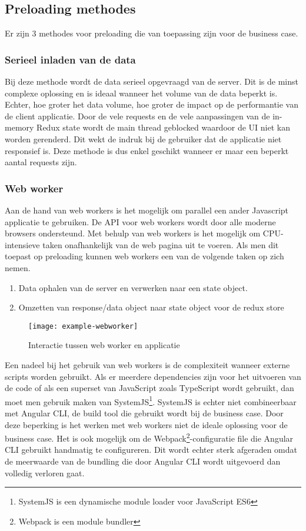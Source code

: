 \subsection{Preloading methodes}
Er zijn 3 methodes voor preloading die van toepassing zijn voor de business case.

\subsubsection{Serieel inladen van de data}
Bij deze methode wordt de data serieel opgevraagd van de server. Dit is de minst complexe oplossing en is ideaal wanneer het volume van de data beperkt is. Echter, hoe groter het data volume, hoe groter de impact op de performantie van de client applicatie. Door de vele requests en de vele aanpassingen van de in-memory Redux state wordt de main thread geblocked waardoor de UI niet kan worden gerenderd. Dit wekt de indruk bij de gebruiker dat de applicatie niet responsief is. Deze methode is dus enkel geschikt wanneer er maar een beperkt aantal requests zijn.

\subsubsection{Web worker}
\label{sssec: web-worker}
Aan de hand van web workers is het mogelijk om parallel een ander Javascript applicatie te gebruiken. De API voor web workers wordt door alle \autocite{web-worker-support} moderne browsers ondersteund. Met behulp van web workers is het mogelijk om CPU-intensieve taken onafhankelijk van de web pagina uit te voeren. Als men dit toepast op preloading kunnen web workers een van de volgende taken op zich nemen.

\begin{enumerate}
\item Data ophalen van de server en verwerken naar een state object.
\item Omzetten van response/data object naar state object voor de redux store
\end{enumerate}

\begin{figure}[h]
\caption{Interactie tussen web worker en applicatie}
\centering
\texttt{[image: example-webworker]}
\end{figure}

Een nadeel bij het gebruik van web workers is de complexiteit wanneer externe scripts worden gebruikt. Als er meerdere dependencies zijn voor het uitvoeren van de code of als een superset van JavaScript zoals TypeScript wordt gebruikt, dan moet men gebruik maken van SystemJS\footnote{SystemJS is een dynamische module loader voor JavaScript ES6}. SystemJS is echter niet combineerbaar met Angular CLI, de build tool die gebruikt wordt bij de business case. Door deze beperking is het werken met web workers niet de ideale oplossing voor de business case. Het is ook mogelijk om de Webpack\footnote{Webpack is een module bundler }-configuratie file die Angular CLI gebruikt handmatig te configureren. Dit wordt echter sterk afgeraden omdat de meerwaarde van de bundling die door Angular CLI wordt uitgevoerd dan volledig verloren gaat.

